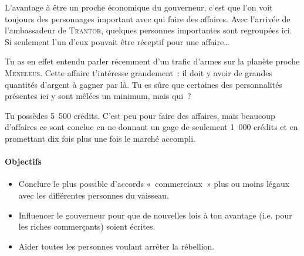 {L’avantage à être un proche économique du gouverneur, c’est que l’on voit toujours des personnages important avec qui faire des affaires.
Avec l’arrivée de l’ambassadeur de \textsc{Trantor}, quelques personnes importantes sont regroupées ici.
Si seulement l’un d’eux pouvait être réceptif pour une affaire…

Tu as en effet entendu parler récemment d’un trafic d’armes sur la planète proche \textsc{Meneleus}.
Cette affaire t’intéresse grandement~:  il doit y avoir de grandes quantités d’argent à gagner par là.
Tu es sûre que certaines des personnalités présentes ici y sont mêlées un minimum, mais qui~?

Tu possèdes 5~500 crédits.
C’est peu pour faire des affaires, mais beaucoup d’affaires ce sont conclue en ne donnant un gage de seulement 1~000 crédits et en promettant dix fois plus une fois le marché accompli.

\paragraph{Objectifs}{
\begin{itemize}
	\item Conclure le plus possible d’accords «~commerciaux~» plus ou moins légaux avec les différentes personnes du vaisseau.
	\item Influencer le gouverneur pour que de nouvelles lois à ton avantage (i.e. pour les riches commerçants) soient écrites.
	\item Aider toutes les personnes voulant arrêter la rébellion.
\end{itemize}
}
}

